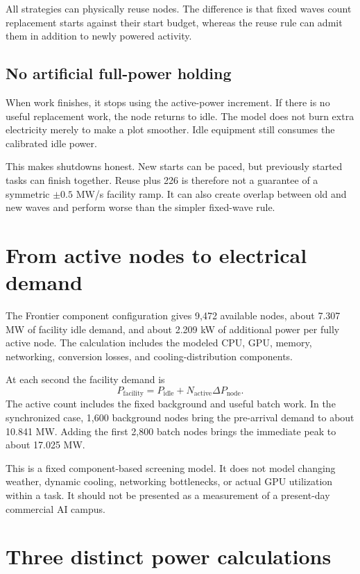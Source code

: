 \documentclass[11pt]{article}
\begin{document}
All strategies can physically reuse nodes. The difference is that fixed
waves count replacement starts against their start budget, whereas the
reuse rule can admit them in addition to newly powered activity.

\subsection{No artificial full-power holding}

When work finishes, it stops using the active-power increment.
If there is no useful replacement work, the node returns to idle.
The model does not burn extra electricity merely to make a plot smoother.
Idle equipment still consumes the calibrated idle power.

This makes shutdowns honest. New starts can be paced, but previously
started tasks can finish together. Reuse plus 226 is therefore not a
guarantee of a symmetric $\pm0.5$ MW/s facility ramp.
It can also create overlap between old and new waves and perform worse
than the simpler fixed-wave rule.

\section{From active nodes to electrical demand}

The Frontier component configuration gives 9,472 available nodes,
about 7.307 MW of facility idle demand, and about 2.209 kW of additional
power per fully active node. The calculation includes the modeled CPU,
GPU, memory, networking, conversion losses, and cooling-distribution
components.

At each second the facility demand is
\[
P_{\mathrm{facility}}=P_{\mathrm{idle}}+
N_{\mathrm{active}}\Delta P_{\mathrm{node}}.
\]
The active count includes the fixed background and useful batch work.
In the synchronized case, 1,600 background nodes bring the pre-arrival
demand to about 10.841 MW. Adding the first 2,800 batch nodes brings
the immediate peak to about 17.025 MW.

This is a fixed component-based screening model. It does not model
changing weather, dynamic cooling, networking bottlenecks, or actual
GPU utilization within a task. It should not be presented as a
measurement of a present-day commercial AI campus.

\section{Three distinct power calculations}
\end{document}
